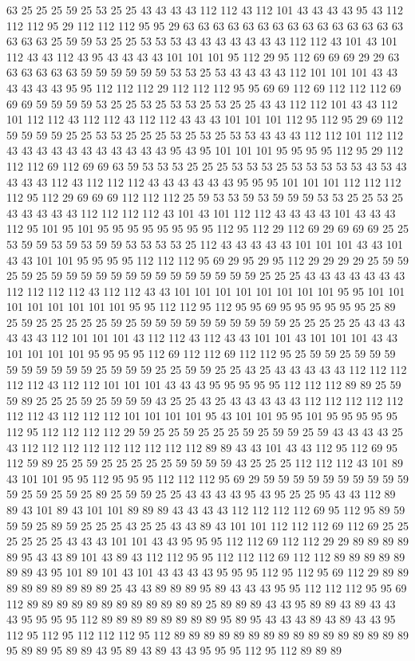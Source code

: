 63 25 25 25 59 25 53 25 25 43 43 43 43 112 112 43 112 101 43 43 43 43 95 43 112 112 112 95 29 112 112 112 95 95 29 63 63 63 63 63 63 63 63 63 63 63 63 63 63 63 63 63 63 25 59 59 53 25 25 53 53 53 43 43 43 43 43 43 43 112 112 43 101 43 101 112 43 43 112 43 95 43 43 43 43 101 101 101 95 112 29 95 112 69 69 69 29 29 63 63 63 63 63 63 59 59 59 59 59 59 53 53 25 53 43 43 43 43 112 101 101 101 43 43 43 43 43 43 95 95 112 112 112 29 112 112 112 95 95 69 69 112 69 112 112 112 69 69 69 59 59 59 59 53 25 25 53 25 53 53 25 53 25 25 43 43 112 112 101 43 43 112 101 112 112 43 112 112 43 112 112 43 43 43 101 101 101 112 95 112 95 29 69 112 59 59 59 59 25 25 53 53 25 25 25 53 25 53 25 53 53 43 43 43 112 112 101 112 112 43 43 43 43 43 43 43 43 43 43 43 95 43 95 101 101 101 95 95 95 95 112 95 29 112 112 112 69 112 69 69 63 59 53 53 53 25 25 25 53 53 53 25 53 53 53 53 53 43 53 43 43 43 43 112 43 112 112 112 43 43 43 43 43 43 95 95 95 101 101 101 112 112 112 112 95 112 29 69 69 69 112 112 112 25 59 53 53 59 53 59 59 59 53 53 25 25 53 25 43 43 43 43 43 112 112 112 112 43 101 43 101 112 112 43 43 43 43 101 43 43 43 112 95 101 95 101 95 95 95 95 95 95 95 95 112 95 112 29 112 69 29 69 69 69 25 25 53 59 59 53 59 53 59 59 53 53 53 53 25 112 43 43 43 43 43 101 101 101 43 43 101 43 43 101 101 95 95 95 95 112 112 112 95 69 29 95 29 95 112 29 29 29 29 25 59 59 25 59 25 59 59 59 59 59 59 59 59 59 59 59 59 59 59 25 25 25 43 43 43 43 43 43 43 112 112 112 112 43 112 112 43 43 101 101 101 101 101 101 101 101 95 95 101 101 101 101 101 101 101 101 95 95 112 112 95 112 95 95 69 95 95 95 95 95 95 25 89 25 59 25 25 25 25 25 59 25 59 59 59 59 59 59 59 59 59 59 25 25 25 25 25 43 43 43 43 43 43 112 101 101 101 43 112 112 43 112 43 43 101 101 43 101 101 101 43 43 101 101 101 101 95 95 95 95 112 69 112 112 69 112 112 95 25 59 59 25 59 59 59 59 59 59 59 59 59 25 59 59 59 25 25 59 59 25 25 43 25 43 43 43 43 43 112 112 112 112 112 43 112 112 101 101 101 43 43 43 95 95 95 95 95 112 112 112 89 89 25 59 59 89 25 25 25 59 25 59 59 59 43 25 25 43 25 43 43 43 43 43 112 112 112 112 112 112 112 43 112 112 112 101 101 101 101 95 43 101 101 95 95 101 95 95 95 95 95 112 95 112 112 112 112 29 59 25 25 59 25 25 25 59 25 59 59 25 59 43 43 43 43 25 43 112 112 112 112 112 112 112 112 112 89 89 43 43 101 43 43 112 95 112 69 95 112 59 89 25 25 59 25 25 25 25 25 59 59 59 59 43 25 25 25 112 112 112 43 101 89 43 101 101 95 95 112 95 95 95 112 112 112 95 69 29 59 59 59 59 59 59 59 59 59 59 59 25 59 25 59 25 89 25 59 59 25 25 43 43 43 43 95 43 95 25 25 95 43 43 112 89 89 43 101 89 43 101 101 89 89 89 43 43 43 43 112 112 112 112 69 95 112 95 89 59 59 59 25 89 59 25 25 25 43 25 25 43 43 89 43 101 101 112 112 112 69 112 69 25 25 25 25 25 25 43 43 43 101 101 43 43 95 95 95 112 112 69 112 112 29 29 89 89 89 89 89 95 43 43 89 101 43 89 43 112 112 95 95 112 112 112 69 112 112 89 89 89 89 89 89 89 43 95 101 89 101 43 101 43 43 43 43 95 95 95 112 95 112 95 69 112 29 89 89 89 89 89 89 89 89 89 25 43 43 89 89 89 95 89 43 43 43 95 95 112 112 112 95 95 69 112 89 89 89 89 89 89 89 89 89 89 89 89 25 89 89 89 43 43 95 89 89 43 89 43 43 43 95 95 95 95 112 89 89 89 89 89 89 89 89 95 89 95 43 43 43 89 43 89 43 43 95 112 95 112 95 112 112 112 95 112 89 89 89 89 89 89 89 89 89 89 89 89 89 89 89 89 95 89 89 95 89 89 43 95 89 43 89 43 43 95 95 95 112 95 112 89 89 89 